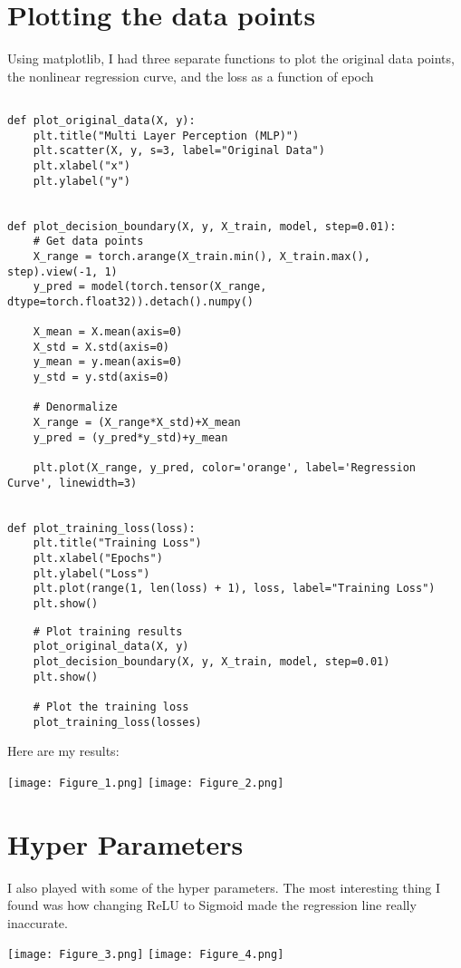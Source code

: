 \documentclass{article}
\begin{document}
\section{Plotting the data points}
Using matplotlib, I had three separate functions to plot the original data points, the nonlinear regression curve, and the loss as a function of epoch

\begin{lstlisting}
    
def plot_original_data(X, y):
    plt.title("Multi Layer Perception (MLP)")
    plt.scatter(X, y, s=3, label="Original Data")
    plt.xlabel("x")
    plt.ylabel("y")


def plot_decision_boundary(X, y, X_train, model, step=0.01):
    # Get data points
    X_range = torch.arange(X_train.min(), X_train.max(), step).view(-1, 1)
    y_pred = model(torch.tensor(X_range, dtype=torch.float32)).detach().numpy()

    X_mean = X.mean(axis=0)
    X_std = X.std(axis=0)
    y_mean = y.mean(axis=0)
    y_std = y.std(axis=0)

    # Denormalize
    X_range = (X_range*X_std)+X_mean
    y_pred = (y_pred*y_std)+y_mean

    plt.plot(X_range, y_pred, color='orange', label='Regression Curve', linewidth=3)


def plot_training_loss(loss):
    plt.title("Training Loss")
    plt.xlabel("Epochs")
    plt.ylabel("Loss")
    plt.plot(range(1, len(loss) + 1), loss, label="Training Loss")
    plt.show()
\end{lstlisting}

\begin{lstlisting}
    # Plot training results
    plot_original_data(X, y)
    plot_decision_boundary(X, y, X_train, model, step=0.01)
    plt.show()

    # Plot the training loss
    plot_training_loss(losses)
\end{lstlisting}

Here are my results:

\texttt{[image: Figure\_1.png]}
\texttt{[image: Figure\_2.png]}

\section{Hyper Parameters}
I also played with some of the hyper parameters. The most interesting thing I found was how changing ReLU to Sigmoid made the regression line really inaccurate.

\texttt{[image: Figure\_3.png]}
\texttt{[image: Figure\_4.png]}
\end{document}
